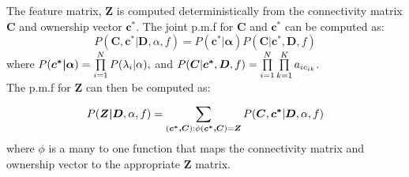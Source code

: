 \noindent
The feature matrix, $\bm Z$ is computed deterministically from the connectivity 
matrix $\bm C$ and ownership vector $\bm{c^*}$. The joint p.m.f for $\bm C$ and 
$\bm c^*$ can be computed as:
\begin{equation}
  P(\bm C, \bm{c^*}|\bm D,\alpha,f) = P(\bm{c^*|\alpha}) P(\bm C|\bm{c^*},\bm D,f)
\end{equation}
where $P(\bm{c^*|\alpha}) = \prod\limits_{i=1}^{N} P(\lambda_i|\alpha),$ and 
$P(\bm C|\bm{c^*},\bm D,f) = \prod\limits_{i=1}^{N}\prod\limits_{k=1}^{K}a_{ic_{ik}}$.\\

\noindent
The p.m.f for $\bm Z$ can then be computed as:
\begin{equation}
  P(\bm{Z|D},\alpha,f) = \sum\limits_{(\bm{c^*,C}):\phi(\bm{c^*,C})=\bm Z}^{} 
                         P(\bm C, \bm{c^*}|\bm D,\alpha,f)
\end{equation}
where $\phi$ is a many to one function that maps the connectivity matrix and
ownership vector to the appropriate $\bm Z$ matrix.




